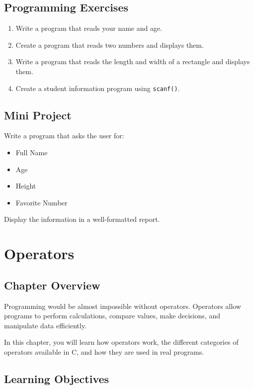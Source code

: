 \documentclass[12pt,openany]{book}
\begin{document}
\section{Programming Exercises}

\begin{enumerate}
    \item Write a program that reads your name and age.
    \item Create a program that reads two numbers and displays them.
    \item Write a program that reads the length and width of a rectangle and displays them.
    \item Create a student information program using \texttt{scanf()}.
\end{enumerate}

\section{Mini Project}

Write a program that asks the user for:

\begin{itemize}
    \item Full Name
    \item Age
    \item Height
    \item Favorite Number
\end{itemize}

Display the information in a well-formatted report.
\chapter{Operators}

\section{Chapter Overview}

Programming would be almost impossible without operators. Operators allow programs to perform calculations, compare values, make decisions, and manipulate data efficiently.

In this chapter, you will learn how operators work, the different categories of operators available in C, and how they are used in real programs.

\section{Learning Objectives}
\end{document}
